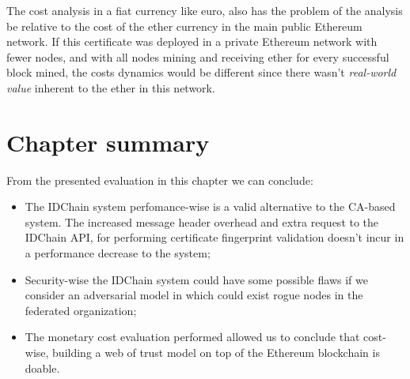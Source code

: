 The cost analysis in a fiat currency like euro, also has the problem of the analysis be relative to the cost of the ether currency in the main public Ethereum network.
If this certificate was deployed in a private Ethereum network with fewer nodes, and with all nodes mining and receiving ether for every successful block mined, the costs dynamics would be different since there wasn't \textit{real-world value} inherent to the ether in this network.

\section{Chapter summary}

From the presented evaluation in this chapter we can conclude:

\begin{itemize}
  \item The IDChain system perfomance-wise is a valid alternative to the CA-based system. The increased message header overhead and extra request to the IDChain API, for performing certificate fingerprint validation doesn't incur in a performance decrease to the system;
  \item Security-wise the IDChain system could have some  possible flaws if we consider an adversarial model in which could exist rogue nodes in the federated organization;
  \item The monetary cost evaluation performed allowed us to conclude that cost-wise, building a web of trust model on top of the Ethereum blockchain is doable.
\end{itemize}
